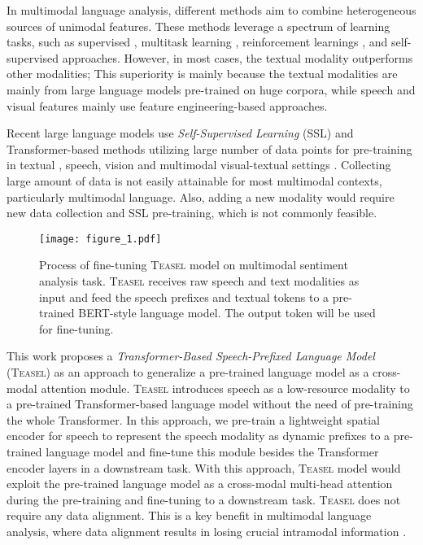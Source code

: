 \documentclass[letterpaper]{article} \usepackage{spconf,amsmath,graphicx}
\newcommand{\teasel}{\textsc{Teasel }}
\newcommand{\teaselns}{\textsc{Teasel}}
\begin{document}
In multimodal language analysis, different methods aim to combine heterogeneous sources of unimodal features. These methods leverage a spectrum of learning tasks, such as supervised \cite{tsai2019MULT}, multitask learning \cite{yu2021le}, reinforcement learnings \cite{chen2017multimodal}, and self-supervised \cite{khare2021self,yu2021le} approaches. However, in most cases, the textual modality outperforms other modalities; This superiority is mainly because the textual modalities are mainly from large language models pre-trained on huge corpora, while speech and visual features mainly use feature engineering-based approaches.

Recent large language models use \textit{Self-Supervised Learning} (SSL) and Transformer-based \cite{vaswani2017attention} methods utilizing large number of data points for pre-training in textual \cite{devlin2018bert,liu2019roberta, radford2019language, brown2020language}, speech\cite{baevski2020wav2vec}, vision \cite{dosovitskiy2020image} and multimodal visual-textual settings \cite{lu2019vilbert}. Collecting large amount of data is not easily attainable for most multimodal contexts, particularly multimodal language. Also, adding a new modality would require new data collection and SSL pre-training, which is not commonly feasible.

\begin{figure}[t]
\centering
\texttt{[image: figure\_1.pdf]} \caption{Process of fine-tuning \teasel model on multimodal sentiment analysis task. \teasel receives raw speech and text modalities as input and feed the speech prefixes and textual tokens to a pre-trained BERT-style language model. The  output token will be used for fine-tuning.}
\label{fig:fine-tune}
\end{figure}

This work proposes a \textit{Transformer-Based Speech-Prefixed Language Model} (\teaselns) as an approach to generalize a pre-trained language model as a cross-modal attention module. \teasel introduces speech as a low-resource modality to a pre-trained Transformer-based language model without the need of pre-training the whole Transformer. In this approach, we pre-train a lightweight spatial encoder for speech to represent the speech modality as dynamic prefixes to a pre-trained language model and fine-tune this module besides the Transformer encoder layers in a downstream task. With this approach, \teasel model would exploit the pre-trained language model as a cross-modal multi-head attention during the pre-training and fine-tuning to a downstream task. 
\teasel does not require any data alignment. This is a key benefit in multimodal language analysis, where data alignment results in losing crucial intramodal information \cite{tsai2019MULT, yu2021le}. 
\end{document}
